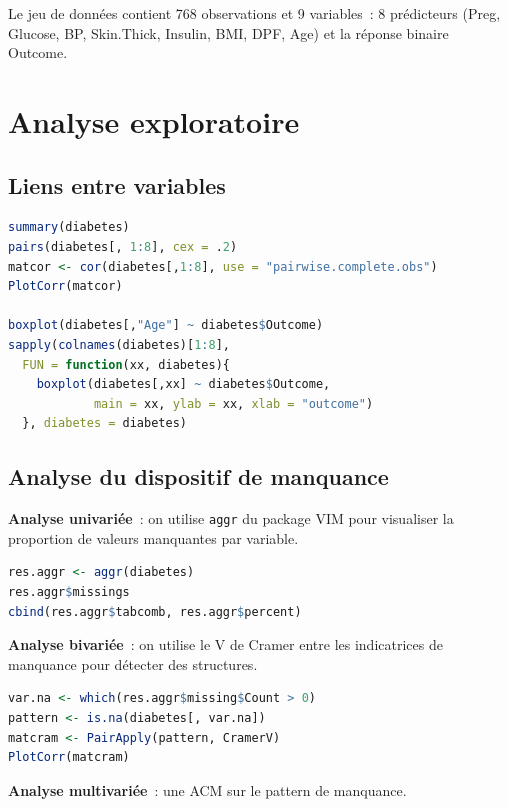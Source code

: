\documentclass[a4paper,11pt]{article}
\theoremstyle{definition}
\theoremstyle{remark}
\begin{document}
Le jeu de donn\'ees contient 768 observations et 9 variables~:
8 pr\'edicteurs (Preg, Glucose, BP, Skin.Thick, Insulin, BMI, DPF,
Age) et la r\'eponse binaire Outcome.

\section{Analyse exploratoire}

\subsection{Liens entre variables}

\begin{lstlisting}[language=R]
summary(diabetes)
pairs(diabetes[, 1:8], cex = .2)
matcor <- cor(diabetes[,1:8], use = "pairwise.complete.obs")
PlotCorr(matcor)

boxplot(diabetes[,"Age"] ~ diabetes$Outcome)
sapply(colnames(diabetes)[1:8],
  FUN = function(xx, diabetes){
    boxplot(diabetes[,xx] ~ diabetes$Outcome,
            main = xx, ylab = xx, xlab = "outcome")
  }, diabetes = diabetes)
\end{lstlisting}

\subsection{Analyse du dispositif de manquance}

\textbf{Analyse univari\'ee}~: on utilise \texttt{aggr} du package
VIM pour visualiser la proportion de valeurs manquantes par variable.

\begin{lstlisting}[language=R]
res.aggr <- aggr(diabetes)
res.aggr$missings
cbind(res.aggr$tabcomb, res.aggr$percent)
\end{lstlisting}

\textbf{Analyse bivari\'ee}~: on utilise le V de Cramer entre les
indicatrices de manquance pour d\'etecter des structures.

\begin{lstlisting}[language=R]
var.na <- which(res.aggr$missing$Count > 0)
pattern <- is.na(diabetes[, var.na])
matcram <- PairApply(pattern, CramerV)
PlotCorr(matcram)
\end{lstlisting}

\textbf{Analyse multivari\'ee}~: une ACM sur le pattern de manquance.
\end{document}
